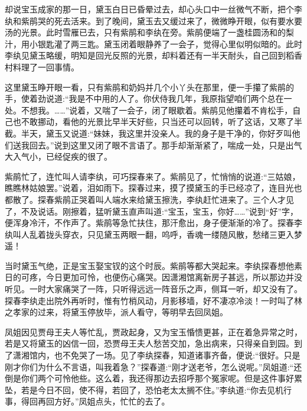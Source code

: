 \begin{parag}
    却说宝玉成家的那一日，黛玉白日已昏晕过去，却心头口中一丝微气不断，把个李纨和紫鹃哭的死去活来。到了晚间，黛玉去又缓过来了，微微睁开眼，似有要水要汤的光景。此时雪雁已去，只有紫鹃和李纨在旁。紫鹃便端了一盏桂圆汤和的梨汁，用小银匙灌了两三匙。黛玉闭着眼静养了一会子，觉得心里似明似暗的。此时李纨见黛玉略缓，明知是回光反照的光景，却料着还有一半天耐头，自己回到稻香村料理了一回事情。
\end{parag}


\begin{parag}
    这里黛玉睁开眼一看，只有紫鹃和奶妈并几个小丫头在那里，便一手攥了紫鹃的手，使着劲说道:“我是不中用的人了。你伏侍我几年，我原指望咱们两个总在一处。不想我。……”说着，又喘了一会子，闭了眼歇着。紫鹃见他攥着不肯松手，自己也不敢挪动，看他的光景比早半天好些，只当还可以回转，听了这话，又寒了半截。半天，黛玉又说道:“妹妹，我这里并没亲人。我的身子是干净的，你好歹叫他们送我回去。”说到这里又闭了眼不言语了。那手却渐渐紧了，喘成一处，只是出气大入气小，已经促疾的很了。
\end{parag}


\begin{parag}
    紫鹃忙了，连忙叫人请李纨，可巧探春来了。紫鹃见了，忙悄悄的说道:“三姑娘，瞧瞧林姑娘罢。”说着，泪如雨下。探春过来，摸了摸黛玉的手已经凉了，连目光也都散了。探春紫鹃正哭着叫人端水来给黛玉擦洗，李纨赶忙进来了。三个人才见了，不及说话。刚擦着，猛听黛玉直声叫道:“宝玉，宝玉，你好……”说到“好”字，便浑身冷汗，不作声了。紫鹃等急忙扶住，那汗愈出，身子便渐渐的冷了。探春李纨叫人乱着拢头穿衣，只见黛玉两眼一翻，呜呼，香魂一缕随风散，愁绪三更入梦遥！
\end{parag}


\begin{parag}
    当时黛玉气绝，正是宝玉娶宝钗的这个时辰。紫鹃等都大哭起来。李纨探春想他素日的可疼，今日更加可怜，也便伤心痛哭。因潇湘馆离新房子甚远，所以那边并没听见。一时大家痛哭了一阵，只听得远远一阵音乐之声，侧耳一听，却又没有了。探春李纨走出院外再听时，惟有竹梢风动，月影移墙，好不凄凉冷淡！一时叫了林之孝家的过来，将黛玉停放毕，派人看守，等明早去回凤姐。
\end{parag}


\begin{parag}
    凤姐因见贾母王夫人等忙乱，贾政起身，又为宝玉惛愦更甚，正在着急异常之时，若是又将黛玉的凶信一回，恐贾母王夫人愁苦交加，急出病来，只得亲自到园。到了潇湘馆内，也不免哭了一场。见了李纨探春，知道诸事齐备，便说:“很好。只是刚才你们为什么不言语，叫我着急？”探春道:“刚才送老爷，怎么说呢。”凤姐道:“还倒是你们两个可怜他些。这么着，我还得那边去招呼那个冤家呢。但是这件事好累坠，若是今日不回，使不得，若回了，恐怕老太太搁不住。”李纨道:“你去见机行事，得回再回方好。”凤姐点头，忙忙的去了。
\end{parag}


